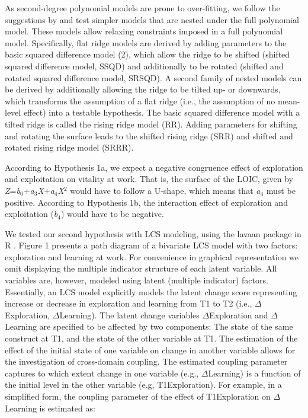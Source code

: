 \documentclass[man]{apa7}
\begin{document}
As second-degree polynomial models are prone to over-fitting, we follow the suggestions by \textcite{Schonbrodt2016} and test simpler models that are nested under the full polynomial model. 
These models allow relaxing constraints imposed in a full polynomial model. 
Specifically, flat ridge models are derived by adding parameters to the basic squared difference model (2), which allow the ridge to be shifted (shifted squared difference model, SSQD) and additionally to be rotated (shifted and rotated squared difference model, SRSQD).
A second family of nested models can be derived by additionally allowing the ridge to be tilted up- or downwards, which transforms the assumption of a flat ridge (i.e., the assumption of no mean-level effect) into a testable hypothesis. The basic squared difference model with a tilted ridge is called the rising ridge model (RR). Adding parameters for shifting and rotating the surface leads to the shifted rising ridge (SRR) and shifted and rotated rising ridge model (SRRR).



According to Hypothesis 1a, we expect a negative congruence effect of exploration and exploitation on vitality at work. 
That is, the surface of the LOIC, given by \textit{Z}=\textit{b}$_0$+\textit{a}$_3$\textit{X}+\textit{a}$_4$\textit{X}$^2$ would have to follow a U-shape, which means that \textit{a}$_4$ must be positive. 
According to Hypothesis 1b, the interaction effect of exploration and exploitation (\textit{b}$_4$) would have to be negative. \par 

We tested our second hypothesis with LCS modeling, using the lavaan package in R \parencite{Rosseel2012}. 
Figure 1 presents a path diagram of a bivariate LCS model with two factors: exploration and learning at work. 
For convenience in graphical representation we omit displaying the multiple indicator structure of each latent variable. 
All variables are, however, modeled using latent (multiple indicator) factors. 
Essentially, an LCS model explicitly models the latent change score representing increase or decrease in exploration and learning from T1 to T2 (i.e., $\Delta$Exploration, $\Delta$Learning). 
The latent change variables $\Delta$Exploration and $\Delta$Learning are specified to be affected by two components: The state of the same construct at T1, and the state of the other variable at T1. 
The estimation of the effect of the initial state of one variable on change in another variable allows for the investigation of cross-domain coupling. 
The estimated coupling parameter captures to which extent change in one variable (e.g., $\Delta$Learning) is a function of the initial level in the other variable (e.g, T1Exploration). 
For example, in a simplified form, the coupling parameter of the effect of T1Exploration on $\Delta$Learning is estimated as:
\end{document}
